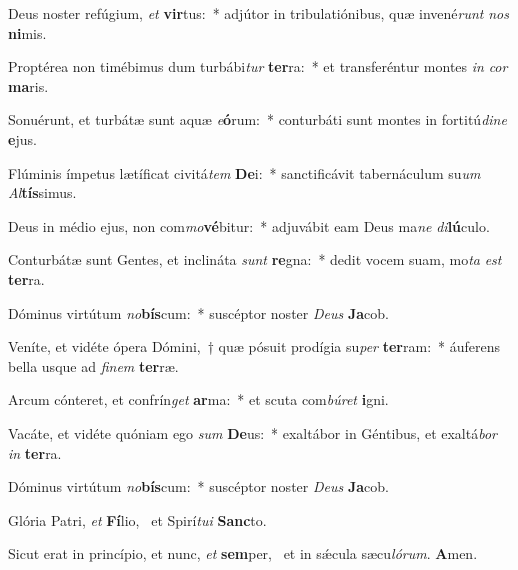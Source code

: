 \item Deus noster refúgium, \textit{et} \textbf{vir}tus:~* adjútor in tribulatiónibus, quæ invené\textit{runt} \textit{nos} \textbf{ni}mis.
\item Proptérea non timébimus dum turbábi\textit{tur} \textbf{ter}ra:~* et transferéntur montes \textit{in} \textit{cor} \textbf{ma}ris.
\item Sonuérunt, et turbátæ sunt aquæ \textit{e}\textbf{ó}rum:~* conturbáti sunt montes in fortitú\textit{di}\textit{ne} \textbf{e}jus.
\item Flúminis ímpetus lætíficat civitá\textit{tem} \textbf{De}i:~* sanctificávit tabernáculum su\textit{um} \textit{Al}\textbf{tís}simus.
\item Deus in médio ejus, non com\textit{mo}\textbf{vé}bitur:~* adjuvábit eam Deus ma\textit{ne} \textit{di}\textbf{lú}culo.
\item Conturbátæ sunt Gentes, et inclináta \textit{sunt} \textbf{re}gna:~* dedit vocem suam, mo\textit{ta} \textit{est} \textbf{ter}ra.
\item Dóminus virtútum \textit{no}\textbf{bís}\-cum:~* suscéptor noster \textit{De}\textit{us} \textbf{Ja}cob.
\item Veníte, et vidéte ópera Dómini,~† quæ pósuit prodígia su\textit{per} \textbf{ter}ram:~* áuferens bella usque ad \textit{fi}\textit{nem} \textbf{ter}ræ.
\item Arcum cónteret, et confrín\textit{get} \textbf{ar}ma:~* et scuta com\textit{bú}\textit{ret} \textbf{i}gni.
\item Vacáte, et vidéte quóniam ego \textit{sum} \textbf{De}us:~* exaltábor in Géntibus, et exaltá\textit{bor} \textit{in} \textbf{ter}ra.
\item Dóminus virtútum \textit{no}\textbf{bís}\-cum:~* suscéptor noster \textit{De}\textit{us} \textbf{Ja}cob.
\item Glória Patri, \textit{et} \textbf{Fí}lio,~\psstar{} et Spirí\textit{tu}\textit{i} \textbf{Sanc}to.
\item Sicut erat in princípio, et nunc, \textit{et} \textbf{sem}per,~\psstar{} et in sǽcula sæcu\textit{ló}\textit{rum}. \textbf{A}men.